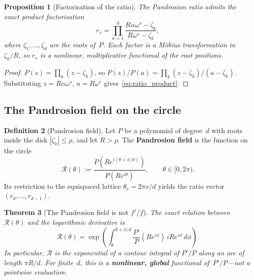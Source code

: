 \documentclass[10pt,a4paper,oneside]{book}
\newtheorem{theorem}{Theorem}[chapter]
\newtheorem{proposition}[theorem]{Proposition}
\theoremstyle{definition}
\newtheorem{definition}[theorem]{Definition}
\theoremstyle{remark}
\begin{document}
\begin{proposition}[Factorisation of the ratio]
\label{prop:ratio_factor}
The Pandrosion ratio admits the exact product factorisation
\begin{equation}
\label{eq:ratio_product}
r_s = \prod_{k=1}^d \frac{R\alpha\omega^s - \zeta_k}{R\omega^s - \zeta_k},
\end{equation}
where $\zeta_1, \ldots, \zeta_d$ are the roots of~$P$.  Each factor is a M\"obius transformation in $\zeta_k/R$, so $r_s$ is a \emph{nonlinear, multiplicative} functional of the root positions.
\end{proposition}

\begin{proof}
$P(z) = \prod_k(z - \zeta_k)$, so $P(z)/P(a) = \prod_k (z - \zeta_k)/(a - \zeta_k)$.  Substituting $z = R\alpha\omega^s$, $a = R\omega^s$ gives~\eqref{eq:ratio_product}.
\end{proof}

\subsection{The Pandrosion field on the circle}
\label{sec:pand_field}

\begin{definition}[Pandrosion field]
\label{def:pand_field}
Let $P$ be a polynomial of degree~$d$ with roots inside the disk $|\zeta_k| \leq \rho$, and let $R > \rho$.  The \textbf{Pandrosion field} is the function on the circle
\begin{equation}
\label{eq:pand_field}
\boxed{\mathcal{R}(\theta) := \frac{P(Re^{i(\theta + \pi/d)})}{P(Re^{i\theta})}, \qquad \theta \in [0, 2\pi).}
\end{equation}
Its restriction to the equispaced lattice $\theta_s = 2\pi s/d$ yields the ratio vector $(r_0, \ldots, r_{d-1})$.
\end{definition}

\begin{theorem}[The Pandrosion field is not $f'/f$]
\label{thm:not_fprimef}
The exact relation between $\mathcal{R}(\theta)$ and the logarithmic derivative is
\begin{equation}
\label{eq:exact_relation}
\mathcal{R}(\theta) = \exp\!\left(\int_\theta^{\theta + \pi/d} \frac{P'}{P}(Re^{i\phi})\,iRe^{i\phi}\,d\phi\right).
\end{equation}
In particular, $\mathcal{R}$ is the \emph{exponential of a contour integral} of $P'/P$ along an arc of length $\pi R/d$.  For finite~$d$, this is a \textbf{nonlinear, global} functional of~$P'/P$---not a pointwise evaluation.
\end{theorem}
\end{document}
